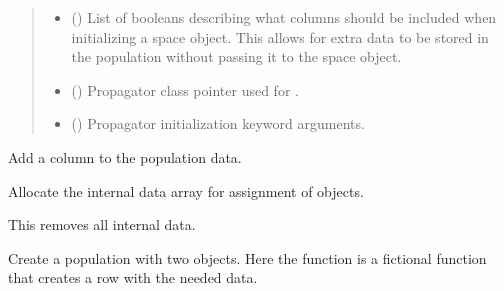 \documentclass[letterpaper,10pt,english]{sphinxmanual}
\begin{document}
\begin{fulllineitems}
\begin{quote}
\begin{description}
\begin{itemize}
\item {} 
 () \textendash{} List of booleans describing what columns should be included when initializing a space object. This allows for extra data to be stored in the population without passing it to the space object.

\item {} 
 ({\hyperref[\detokenize{modules/propagator_base:propagator_base.PropagatorBase}]{}}) \textendash{} Propagator class pointer used for {\hyperref[\detokenize{modules/space_object:space_object.SpaceObject}]{}}.

\item {} 
 () \textendash{} Propagator initialization keyword arguments.

\end{itemize}

\end{description}\end{quote}

\begin{fulllineitems}
\label{\detokenize{modules/population:population.Population.add_column}}
Add a column to the population data.

\end{fulllineitems}


\begin{fulllineitems}
\label{\detokenize{modules/population:population.Population.allocate}}
Allocate the internal data array for assignment of objects.

 This removes all internal data.


Create a population with two objects. Here the  function is a fictional function that creates a row with the needed data.


\end{fulllineitems}
\end{fulllineitems}
\end{document}
